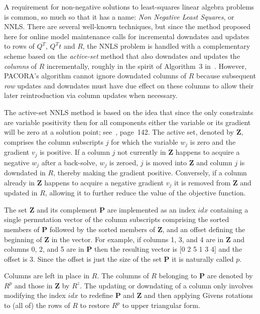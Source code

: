 A requirement for non-negative solutions to least-squares linear algebra problems is common,
so much so that it has a name: \emph{Non Negative Least Squares}, or NNLS.
There are several well-known techniques\cite{ChPl},
but since the method proposed here for online model maintenance calls for
incremental downdates and updates to rows of $Q^T$, $Q^Tt$ and $R$,
the NNLS problem is handled with a complementary scheme
based on the \emph{active-set} method\cite{LaHa} that
also downdates and updates the \emph{columns} of $R$ incrementally,
roughly in the spirit of Algorithm~3 in~\cite{LuDu}.
However, PACORA's algorithm cannot ignore downdated columns of $R$
because subsequent \emph{row} updates and downdates must have due effect
on these columns to allow their later reintroduction via column updates when necessary.

The active-set NNLS method is based on the idea that since the only constraints are variable positivity
then for all components either the variable or its gradient will be zero at a solution point; see~\cite{BoVa}, page~142.
The active set, denoted by \textbf{Z}, comprises the column subscripts $j$ for which the variable $w_j$ is zero and the gradient $v_j$ is positive.
If a column $j$ not currently in \textbf{Z} happens to acquire a negative $w_j$ after a back-solve, $w_j$ is zeroed,
$j$ is moved into \textbf{Z} and column $j$ is downdated in $R$, thereby making the gradient positive.
Conversely, if a column already in \textbf{Z} happens to acquire a negative gradient $v_j$ it is removed from \textbf{Z} and updated in $R$,
allowing it to further reduce the value of the objective function.

The set \textbf{Z} and its complement \textbf{P} are implemented as an index $idx$
containing a single permutation vector of the column subscripts comprising
the sorted members of \textbf{P} followed by the sorted members of \textbf{Z},
and an offset defining the beginning of \textbf{Z} in the vector.
For example, if columns 1, 3, and 4 are in \textbf{Z} and columns 0, 2, and 5 are in \textbf{P}
then the resulting vector is [0 2 5 1 3 4] and the offset is 3.
Since the offset is just the size of the set \textbf{P} it is naturally called $p$.

Columns are left in place in $R$. The columns of $R$ belonging to \textbf{P} are denoted by $R^p$ and those in \textbf{Z} by $R^z$.
The updating or downdating of a column only involves modifying the index $idx$ to redefine \textbf{P} and \textbf{Z} and then
applying Givens rotations to (all of) the rows of $R$ to restore $R^p$ to upper triangular form. 

